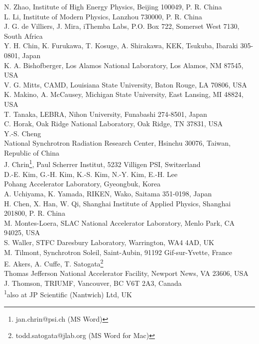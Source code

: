\documentclass[a4paper,
				]{jacow}
\begin{document}
{		N. Zhao, Institute of High Energy Physics, Beijing 100049, P. R. China \\
		L. Li, Institute of Modern Physics, Lanzhou 730000, P. R. China \\
		J. G. de Villiers, J. Mira, iThemba Labs, P.O. Box 722, Somerset West 7130, South Africa \\
		Y. H. Chin, K. Furukawa, T. Kosuge, A. Shirakawa, 
		KEK, Tsukuba, Ibaraki 305-0801, Japan \\
		K. A. Bishofberger, Los Alamos National Laboratory, Los Alamos, NM 87545, USA \\
		V. G. Mitts, CAMD, Louisiana State University, Baton Rouge, LA 70806, USA \\ 
		K. Makino, A. McCausey, Michigan State University, East Lansing, MI 48824, USA \\
		T. Tanaka, LEBRA, Nihon University, Funabashi 274-8501, Japan \\
		C. Horak, Oak Ridge National Laboratory, Oak Ridge, TN 37831, USA \\
		Y.-S. Cheng  \\
		National Synchrotron Radiation Research Center, Hsinchu 30076, Taiwan, Republic of China \\ 
		J. Chrin\thanks{jan.chrin@psi.ch (MS Word)}, Paul Scherrer Institut, 5232 Villigen PSI, Switzerland \\
		D.-E. Kim, G.-H. Kim, K.-S. Kim, N.-Y. Kim, E.-H. Lee \\
		Pohang Accelerator Laboratory, Gyeongbuk, Korea\\
		A. Uchiyama, K. Yamada, RIKEN, Wako, Saitama 351-0198, Japan \\
		H. Chen, X. Han, W. Qi, Shanghai Institute of Applied Physics, Shanghai 201800, P. R. China \\
		M. Montes-Loera, SLAC National Accelerator Laboratory, Menlo Park, CA 94025, USA \\
		S. Waller, STFC Daresbury Laboratory, Warrington, WA4 4AD, UK \\
		M. Tilmont, Synchrotron Soleil, Saint-Aubin, 91192 Gif-sur-Yvette, France \\
		E. Akers, A. Cuffe, T. Satogata\thanks{todd.satogata@jlab.org (MS Word for Mac)} \\
		Thomas Jefferson National Accelerator Facility, Newport News, VA 23606, USA \\
		J. Thomson, TRIUMF, Vancouver, BC V6T 2A3, Canada \\
		\textsuperscript{1}also at JP Scientific (Nantwich) Ltd, UK}

	\maketitle

\raggedend
\end{document}
